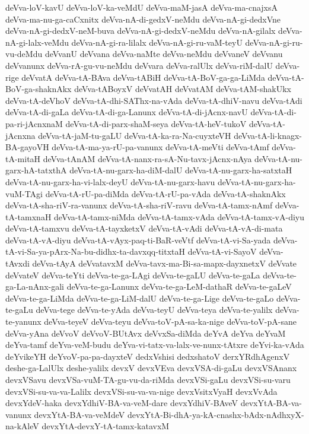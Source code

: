 {deVva-loV-kavU
deVva-loV-ka-veMdU
deVva-maM-jasA
deVva-ma-cnajxsA
deVva-ma-nu-ga-caCxnitx
deVva-nA-di-gedxV-neMdu
deVva-nA-gi-dedxVne
deVva-nA-gi-dedxV-neM-buva
deVva-nA-gi-dedxV-neMdu
deVva-nA-gilalx
deVva-nA-gi-lalx-veMdu
deVva-nA-gi-ra-lilalx
deVva-nA-gi-ru-vaM-teyU
deVva-nA-gi-ru-vu-deMdu
deVvanU
deVvana
deVva-naMte
deVva-neMdu
deVvaneV
deVvanu
deVvanunx
deVva-rA-gu-vu-neMdu
deVvara
deVva-ralUlx
deVva-riM-dalU
deVva-rige
deVvatA
deVva-tA-BAva
deVva-tABiH
deVva-tA-BoV-ga-ga-LiMda
deVva-tA-BoV-ga-shaknAkx
deVva-tABoyxV
deVvatAH
deVvatAM
deVva-tAM-shakUkx
deVva-tA-deVhoV
deVva-tA-dhi-SAThx-na-vAda
deVva-tA-dhiV-navu
deVva-tAdi
deVva-tA-di-gaLa
deVva-tA-di-ga-Lanunx
deVva-tA-di-jAcnx-navU
deVva-tA-di-pa-ri-jAcnxnaM
deVva-tA-di-parx-shaM-seya
deVva-tA-heV-tukoV
deVva-tA-jAcnxna
deVva-tA-jaM-tu-gaLU
deVva-tA-ka-ra-Na-cuyxteVH
deVva-tA-li-knagx-BA-gayoVH
deVva-tA-ma-ya-rU-pa-vanunx
deVva-tA-meVti
deVva-tAmf
deVva-tA-mitaH
deVva-tAnAM
deVva-tA-nanx-ra-sA-Nu-tavx-jAcnx-nAya
deVva-tA-nu-garx-hA-tatxthA
deVva-tA-nu-garx-ha-diM-dalU
deVva-tA-nu-garx-ha-satxtaH
deVva-tA-nu-garx-ha-vi-lalx-deyU
deVva-tA-nu-garx-havu
deVva-tA-nu-garx-ha-vuM-TAgi
deVva-tA-rU-pa-diMda
deVva-tA-rU-pa-vAda
deVva-tA-shaknAkx
deVva-tA-sha-riV-ra-vanunx
deVva-tA-sha-riV-ravu
deVva-tA-tamx-nAmf
deVva-tA-tamxnaH
deVva-tA-tamx-niMda
deVva-tA-tamx-vAda
deVva-tA-tamx-vA-diyu
deVva-tA-tamxvu
deVva-tA-tayxketxV
deVva-tA-vAdi
deVva-tA-vA-di-mata
deVva-tA-vA-diyu
deVva-tA-vAyx-paq-ti-BaR-veVtf
deVva-tA-vi-Sa-yada
deVva-tA-vi-Sa-ya-pArx-Na-bu-didhx-ta-davxqq-titxtaH
deVva-tA-vi-SayoV
deVva-tAvxdi
deVva-tAyA
deVvatavxM
deVva-tavx-ma-Bi-sa-mapx-dayxnetxV
deVvate
deVvateV
deVva-teYti
deVva-te-ga-LAgi
deVva-te-gaLU
deVva-te-gaLa
deVva-te-ga-La-nAnx-gali
deVva-te-ga-Lanunx
deVva-te-ga-LeM-dathaR
deVva-te-gaLeV
deVva-te-ga-LiMda
deVva-te-ga-LiM-dalU
deVva-te-ga-Lige
deVva-te-gaLo
deVva-te-gaLu
deVva-tege
deVva-te-yAda
deVva-teyU
deVva-teya
deVva-te-yalilx
deVva-te-yanunx
deVva-teyeV
deVva-teyu
deVva-toV-pA-sa-ka-nige
deVva-toV-pA-sane
deVva-yAna
deVvoV
deVvoV-BUtAvx
deVvxSa-diMda
deYvA
deYva
deYvaM
deYva-tamf
deYva-veM-budu
deYva-vi-tatx-va-lalx-ve-nunx-tAtxre
deYvi-ka-vAda
deYvikeYH
deYvoV-pa-pa-dayxteV
dedxVshisi
dedxshatoV
derxYRdhAgenxV
deshe-ga-LalUlx
deshe-yalilx
devxV
devxVEva
devxVSA-di-gaLu
devxVSAnanx
devxVSavu
devxVSa-vuM-TA-gu-vu-da-riMda
devxVSi-gaLu
devxVSi-su-varu
devxVSi-su-va-va-Lalilx
devxVSi-su-va-va-nige
devxVsitxVyaH
devxVvAda
devxYdeV-haka
devxYdhiV-BA-va-veM-dare
devxYdhiV-BAveV
devxYtA-BA-va-vanunx
devxYtA-BA-va-veMdeV
devxYtA-Bi-dhA-ya-kA-cnashx-bAdx-nAdhxyX-na-kAleV
devxYtA-devxY-tA-tamx-katavxM
}
